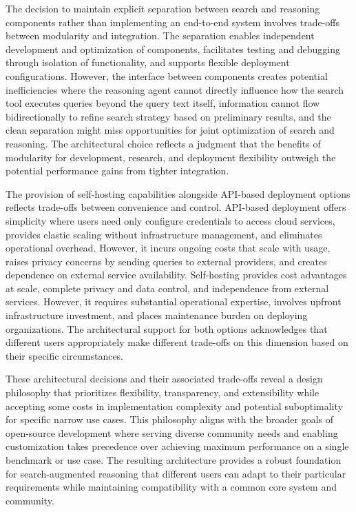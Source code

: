 The decision to maintain explicit separation between search and reasoning components rather than implementing an end-to-end system involves trade-offs between modularity and integration. The separation enables independent development and optimization of components, facilitates testing and debugging through isolation of functionality, and supports flexible deployment configurations. However, the interface between components creates potential inefficiencies where the reasoning agent cannot directly influence how the search tool executes queries beyond the query text itself, information cannot flow bidirectionally to refine search strategy based on preliminary results, and the clean separation might miss opportunities for joint optimization of search and reasoning. The architectural choice reflects a judgment that the benefits of modularity for development, research, and deployment flexibility outweigh the potential performance gains from tighter integration.

The provision of self-hosting capabilities alongside API-based deployment options reflects trade-offs between convenience and control. API-based deployment offers simplicity where users need only configure credentials to access cloud services, provides elastic scaling without infrastructure management, and eliminates operational overhead. However, it incurs ongoing costs that scale with usage, raises privacy concerns by sending queries to external providers, and creates dependence on external service availability. Self-hosting provides cost advantages at scale, complete privacy and data control, and independence from external services. However, it requires substantial operational expertise, involves upfront infrastructure investment, and places maintenance burden on deploying organizations. The architectural support for both options acknowledges that different users appropriately make different trade-offs on this dimension based on their specific circumstances.

These architectural decisions and their associated trade-offs reveal a design philosophy that prioritizes flexibility, transparency, and extensibility while accepting some costs in implementation complexity and potential suboptimality for specific narrow use cases. This philosophy aligns with the broader goals of open-source development where serving diverse community needs and enabling customization takes precedence over achieving maximum performance on a single benchmark or use case. The resulting architecture provides a robust foundation for search-augmented reasoning that different users can adapt to their particular requirements while maintaining compatibility with a common core system and community.
